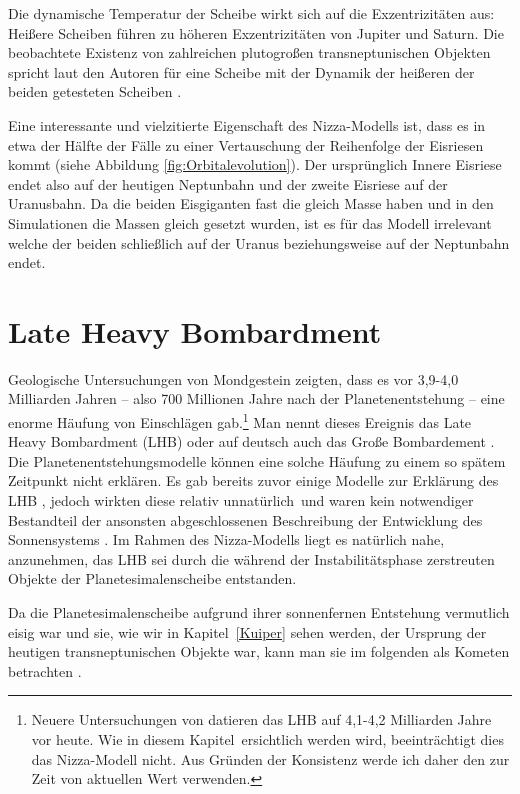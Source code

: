 \documentclass[12pt,a4paper,twoside,open=right,bibliography=totoc]{scrbook}
\renewcommand{\cite}{ \citep}
\begin{document}
Die dynamische Temperatur der Scheibe wirkt sich auf die Exzentrizitäten aus: Heißere Scheiben führen zu höheren Exzentrizitäten von Jupiter und Saturn. Die beobachtete Existenz von zahlreichen plutogroßen transneptunischen Objekten spricht laut den Autoren für eine Scheibe mit der Dynamik der heißeren der beiden getesteten Scheiben\cite{Stern1991,Tsiganis2005}.

Eine interessante und vielzitierte Eigenschaft des Nizza-Modells ist, dass es in etwa der Hälfte der Fälle zu einer Vertauschung der Reihenfolge der Eisriesen kommt (siehe Abbildung \ref{fig:Orbitalevolution}). Der ursprünglich Innere Eisriese endet also auf der heutigen Neptunbahn und der zweite Eisriese auf der Uranusbahn. Da die beiden Eisgiganten fast die gleich Masse haben und in den Simulationen die Massen gleich gesetzt wurden, ist es für das Modell irrelevant welche der beiden schließlich auf der Uranus beziehungsweise auf der Neptunbahn endet.


\FloatBarrier
\section{Late Heavy Bombardment}\label{LHB}
Geologische Untersuchungen von Mondgestein zeigten, dass es vor 3,9-4,0 Milliarden Jahren -- also 700 Millionen Jahre nach der Planetenentstehung --
eine enorme Häufung von Einschlägen gab.\footnote{Neuere Untersuchungen von \cite{Bottke2012} datieren das LHB auf 4,1-4,2 Milliarden Jahre vor heute. Wie in diesem Kapitel~ersichtlich werden wird, beeinträchtigt dies das Nizza-Modell nicht. Aus Gründen der Konsistenz werde ich daher den zur Zeit von \cite{Gomes2005} aktuellen Wert verwenden.} Man nennt dieses Ereignis das Late Heavy Bombardment (LHB) oder auf deutsch auch das Große Bombardement\cite{Tera1974,Hartmann2000,Ryder2002}.
Die Planetenentstehungsmodelle können eine solche Häufung zu einem so spätem Zeitpunkt nicht erklären.
Es gab bereits zuvor einige Modelle zur Erklärung des LHB \citep[insb.][]{Zappal1998Icar,Levison2001Icar,Chambers2002LPI,Levison2004ASPC}, jedoch wirkten diese relativ \glqq unnatürlich\grqq\ und waren kein notwendiger Bestandteil der ansonsten abgeschlossenen Beschreibung der Entwicklung des Sonnensystems\cite{Gomes2005}.
Im Rahmen des Nizza-Modells liegt es natürlich nahe, anzunehmen, das LHB sei durch die während der Instabilitätsphase zerstreuten Objekte der Planetesimalenscheibe entstanden.

Da die Planetesimalenscheibe aufgrund ihrer sonnenfernen Entstehung vermutlich eisig war und sie, wie wir in Kapitel~\ref{Kuiper} sehen werden, der Ursprung der heutigen transneptunischen Objekte war, kann man sie im folgenden als Kometen betrachten\cite{Gomes2005}. %
\end{document}
